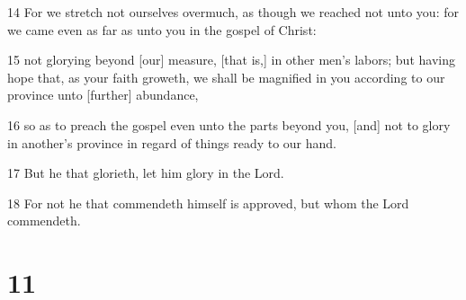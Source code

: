 \par 14 For we stretch not ourselves overmuch, as though we reached not unto you: for we came even as far as unto you in the gospel of Christ:
\par 15 not glorying beyond [our] measure, [that is,] in other men's labors; but having hope that, as your faith groweth, we shall be magnified in you according to our province unto [further] abundance,
\par 16 so as to preach the gospel even unto the parts beyond you, [and] not to glory in another's province in regard of things ready to our hand.
\par 17 But he that glorieth, let him glory in the Lord.
\par 18 For not he that commendeth himself is approved, but whom the Lord commendeth.

\chapter{11}

